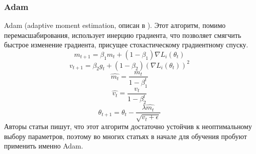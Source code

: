 		\subsubsection{Adam}
			Adam (adaptive moment estimation, описан в \cite{Kingma}). Этот алгоритм, помимо перемасшабирования, использует инерцию градиента, что позволяет смягчить быстрое изменение градиента, присущее стохастическому градиентному спуску.
			$$ m_{t+1} = \beta_1 m_t + (1 - \beta_1) \nabla L_i(\theta_t) $$
			$$ v_{t+1} = \beta_2 g_t + (1 - \beta_2) (\nabla L_i(\theta_t))^2 $$
			$$ \hat{m_t} = \frac{m_t}{1 - \beta_1^t} $$
			$$ \hat{v_t} = \frac{v_t}{1 - \beta_2^t}$$
			$$ \theta_{t+1} = \theta_t - \frac{\lambda \hat{m_t}}{\sqrt{v_t + \epsilon}} $$
			Авторы статьи \cite{Kingma} пишут, что этот алгоритм достаточно устойчив к неоптимальному выбору параметров, поэтому во многих статьях в начале для обучения пробуют применить именно Adam.